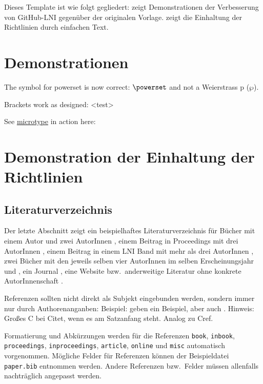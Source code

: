 \documentclass[english,utf8]{lni}
\begin{document}
Dieses Template ist wie folgt gegliedert:
 zeigt Demonstrationen der Verbesserung von GitHub-LNI gegenüber der originalen Vorlage.
 zeigt die Einhaltung der Richtlinien durch einfachen Text.

\section{Demonstrationen}
\label{sec:demos}
The symbol for powerset is now correct: $\powerset$ and not a Weierstrass p ($\wp$).

Brackets work as designed:
<test>

See \href{https://www.ctan.org/pkg/microtype}{microtype} in action here:
\blindtext

\section{Demonstration der Einhaltung der Richtlinien}
\label{sec:lniconformance}

\subsection{Literaturverzeichnis}
Der letzte Abschnitt zeigt ein beispielhaftes Literaturverzeichnis für Bücher mit einem Autor \cite{Ez10} und zwei AutorInnen \cite{AB00}, einem Beitrag in Proceedings mit drei AutorInnen \cite{ABC01}, einem Beitrag in einem LNI Band mit mehr als drei AutorInnen \cite{Az09}, zwei Bücher mit den jeweils selben vier AutorInnen im selben Erscheinungsjahr \cite{Wa14} und \cite{Wa14b}, ein Journal \cite{Gl06}, eine Website \cite{GI14} bzw.\ anderweitige Literatur ohne konkrete AutorInnenschaft \cite{XX14}.

Referenzen sollten nicht direkt als Subjekt eingebunden werden, sondern immer nur durch Authorenanganben:
Beispiel:  geben ein Beispiel, aber auch \citet{Az09}.
Hinweis: Großes C bei Citet, wenn es am Satzanfang steht. Analog zu Cref.

Formatierung und Abkürzungen werden für die Referenzen \texttt{book}, \texttt{inbook}, \texttt{proceedings}, \texttt{inproceedings}, \texttt{article}, \texttt{online} und \texttt{misc} automatisch vorgenommen.
Mögliche Felder für Referenzen können der Beispieldatei \texttt{paper.bib} entnommen werden.
Andere Referenzen bzw.\ Felder müssen allenfalls nachträglich angepasst werden.
\end{document}

